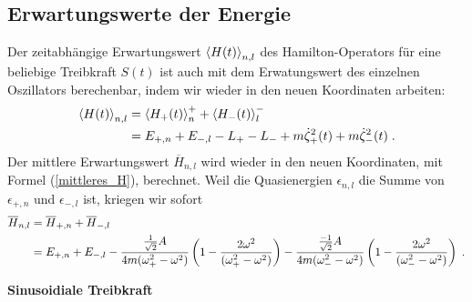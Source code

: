  \subsection{Erwartungswerte der Energie}
    Der zeitabhängige Erwartungswert $\braket{H(t)}_{n,l}$ des Hamilton-Operators für eine beliebige Treibkraft $S(t)$ ist auch mit dem Erwatungswert des einzelnen Oszillators berechenbar, indem wir wieder in den neuen Koordinaten arbeiten:
    \begin{align}
      \braket{H(t)}_{n,l} &= \braket{H_+(t)}_n^+ + \braket{H_-(t)}_l^- \notag\\
      &= E_{+,n}+E_{-,l} -L_+-L_- +m\dot\zeta_+^2(t)+m\dot\zeta_-^2(t) \; .
    \end{align}
    Der mittlere Erwartungswert $\overline{H}_{n,l}$ wird wieder in den neuen Koordinaten, mit Formel (\ref{mittleres_H}), berechnet.
    Weil die Quasienergien $\epsilon_{n,l}$ die Summe von $\epsilon_{+,n}$ und $\epsilon_{-,l}$ ist, kriegen wir sofort
    \begin{align}
      \overline{H}_{n,l}&=\overline{H}_{+,n}+\overline{H}_{-,l}  \notag\\
      &=E_{+,n}+E_{-,l} - \frac{\frac{1}{\sqrt 2} A}{4m(\omega_+^2-\omega^2)}\left(1-\frac{2\omega^2}{(\omega_+^2-\omega^2)}\right)
      - \frac{\frac{-1}{\sqrt 2} A}{4m(\omega_-^2-\omega^2)}\left(1-\frac{2\omega^2}{(\omega_-^2-\omega^2)}\right) \; .
    \end{align}

    \textbf{Sinusoidiale Treibkraft}

